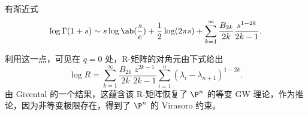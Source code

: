 \begin{lem}
    有渐近式
    \[ \log \Gamma(1+s) \sim s \log \ab(\frac{s}{e}) + \frac{1}{2} \log(2\pi s) + \sum_{k=1}^{\infty} \frac{B_{2k}}{2k} \frac{s^{1-2k}}{2k-1}. \]
\end{lem}
利用这一点，可见在 \(q = 0\) 处，R-矩阵的对角元由下式给出
\[ \log R = \sum_{k=1}^{\infty} \frac{B_{2k}}{2k} \frac{z^{2k-1}}{2k-1} \sum_{i =1}^n (\lambda_i - \lambda_{n+1})^{1-2k}. \]
由 Givental 的一个结果，这蕴含该 R-矩阵恢复了 \(\P^n\) 的等变 GW 理论，作为推论，因为非等变极限存在，得到了 \(\P^n\) 的 Virasoro 约束。
